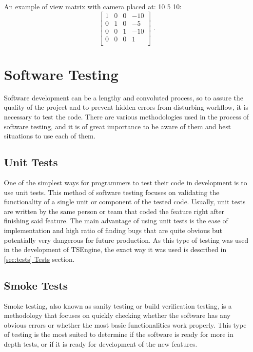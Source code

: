 An example of view matrix with camera placed at: 10 5 10:
\[
\begin{bmatrix}
1 & 0 & 0 & -10\\
0 & 1 & 0 & -5\\
0 & 0 & 1 & -10\\
0 & 0 & 0 & 1\\
\end{bmatrix} 
\text{ .}
\]

\newpage
\section{Software Testing}
\label{sec:testing}
\hspace{\parindent}
Software development can be a lengthy and convoluted process, so to assure the quality of the project and to prevent hidden errors from disturbing workflow, it is necessary to test the code. There are various methodologies used in the process of software testing, and it is of great importance to be aware of them and best situations to use each of them.
\subsection{Unit Tests}
\hspace{\parindent}
One of the simplest ways for programmers to test their code in development is to use unit tests. This method of software testing focuses on validating the functionality of a single unit or component of the tested code. Usually, unit tests are written by the same person or team that coded the feature right after finishing said feature. The main advantage of using unit tests is the ease of implementation and high ratio of finding bugs that are quite obvious but potentially very dangerous for future production. As this type of testing was used in the development of TSEngine, the exact way it was used is described in \hyperref[sec:tests]{\ref*{sec:tests} Tests} section.

\subsection{Smoke Tests}
\hspace{\parindent}
Smoke testing, also known as sanity testing or build verification testing, is a methodology that focuses on quickly checking whether the software has any obvious errors or whether the most basic functionalities work properly. This type of testing is the most suited to determine if the software is ready for more in depth tests, or if it is ready for development of the new features.

